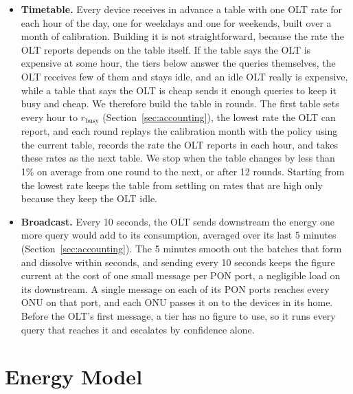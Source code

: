 \documentclass[cic,dipl,english]{infufrgs}
\begin{document}
\begin{itemize}
  \item \textbf{Timetable.} Every device receives in advance a table with one OLT rate for
  each hour of the day, one for weekdays and one for weekends, built over a month of
  calibration. Building it is not straightforward, because the rate the OLT reports
  depends on the table itself. If the table says the OLT is expensive at some hour, the
  tiers below answer the queries themselves, the OLT receives few of them and stays idle,
  and an idle OLT really is expensive, while a table that says the OLT is cheap sends it
  enough queries to keep it busy and cheap. We therefore build the table in rounds. The
  first table sets every hour to $r_{\text{busy}}$ (Section~\ref{sec:accounting}), the
  lowest rate the OLT can report, and each round replays the calibration month with the
  policy using the current table, records the rate the OLT reports in each hour, and takes
  these rates as the next table. We stop when the table changes by less than 1\% on
  average from one round to the next, or after 12 rounds. Starting from the lowest rate
  keeps the table from settling on rates that are high only because they keep the OLT
  idle.
  \item \textbf{Broadcast.} Every 10 seconds, the OLT sends downstream the energy one
  more query would add to its consumption, averaged over its last 5 minutes
  (Section~\ref{sec:accounting}). The 5 minutes smooth out the batches that form and
  dissolve within seconds, and sending every 10 seconds keeps the figure current at the
  cost of one small message per PON port, a negligible load on its downstream. A single message on each of its PON ports reaches every
  ONU on that port, and each ONU passes it on to the devices in its home. Before the
  OLT's first message, a tier has no figure to use, so it runs every query that reaches it
  and escalates by confidence alone.
\end{itemize}

\section{Energy Model}
\label{sec:energy-model}
\end{document}
